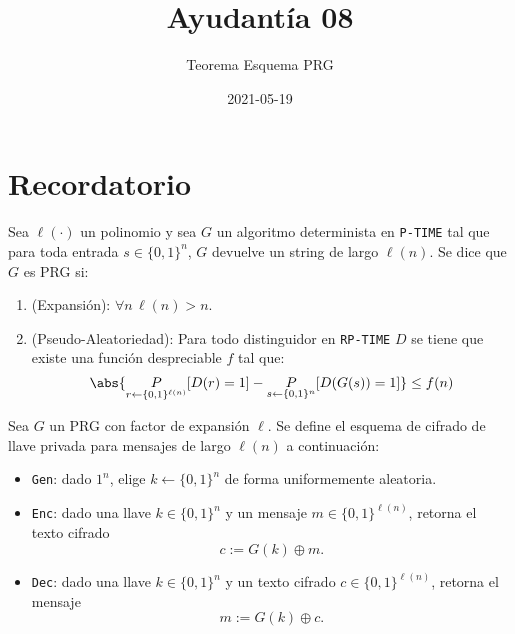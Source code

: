 \documentclass{ayudantia}
\title{Ayudantía 08}
\subtitle{Teorema Esquema PRG}
\date{2021-05-19}
\begin{document}
\maketitle
\section{Recordatorio}
\begin{defn}
    Sea \(\ell(\cdot)\) un polinomio y sea \(G\) un algoritmo determinista en \texttt{P-TIME} tal que para toda entrada \(s\in\{0,1\}^n\), \(G\) devuelve un string de largo \(\ell(n)\). Se dice que \(G\) es PRG si:
    \begin{enumerate}
        \item (Expansión): \(\forall n\,\ell(n)>n\).
        \item (Pseudo-Aleatoriedad): Para todo distinguidor en \texttt{RP-TIME} \(D\) se tiene que existe una función despreciable \(f\) tal que:
        \begin{equation*}
            \abs{\underset{r\leftarrow\{0,1\}^{\ell(n)}}{P}[D(r)=1]-\underset{s\leftarrow\{0,1\}^n}{P}[D(G(s))=1]}\leq f(n)
        \end{equation*}
    \end{enumerate}
\end{defn}

\begin{defn}
    Sea \(G\) un PRG con factor de expansión \(\ell\). Se define el esquema de cifrado de llave privada para mensajes de largo \(\ell(n)\) a continuación:
    \begin{itemize}
        \item \texttt{Gen}: dado \(1^n\), elige \(k\leftarrow\{0,1\}^n\) de forma uniformemente aleatoria.
        \item \texttt{Enc}: dado una llave \(k\in\{0,1\}^n\) y un mensaje \(m\in\{0,1\}^{\ell(n)}\), retorna el texto cifrado
        \begin{equation*}
            c:=G(k)\oplus m.
        \end{equation*}
        \item \texttt{Dec}: dado una llave \(k\in\{0,1\}^n\) y un texto cifrado \(c\in\{0,1\}^{\ell(n)}\), retorna el mensaje
        \begin{equation*}
            m:=G(k)\oplus c.
        \end{equation*}
    \end{itemize}
\end{defn}
\end{document}
